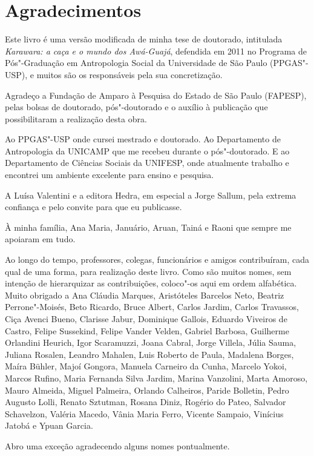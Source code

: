 \chapter*{Agradecimentos}


\noindent Este livro é uma versão modificada de minha tese de doutorado,
intitulada \emph{Karawara: a caça e o mundo dos Awá-Guajá}, defendida em
2011 no Programa de Pós"-Graduação em Antropologia Social da Universidade
de São Paulo (PPGAS"-USP), e muitos são os responsáveis pela sua
concretização.

Agradeço a Fundação de Amparo à Pesquisa do Estado de São Paulo
(FAPESP), pelas bolsas de doutorado, pós"-doutorado e o auxílio à
publicação que possibilitaram a realização desta obra.

Ao PPGAS"-USP onde cursei mestrado e doutorado. Ao Departamento de
Antropologia da UNICAMP que me recebeu durante o pós"-doutorado. E ao
Departamento de Ciências Sociais da UNIFESP, onde atualmente trabalho e
encontrei um ambiente excelente para ensino e pesquisa.

A Luísa Valentini e a editora Hedra, em especial a Jorge Sallum, pela
extrema confiança e pelo convite para que eu publicasse.

À minha família, Ana Maria, Januário, Aruan, Tainá e Raoni que sempre me
apoiaram em tudo.

Ao longo do tempo, professores, colegas, funcionários e amigos
contribuíram, cada qual de uma forma, para realização deste livro. Como
são muitos nomes, sem intenção de hierarquizar as contribuições,
coloco"-os aqui em ordem alfabética. Muito obrigado a Ana Cláudia
Marques, Aristóteles Barcelos Neto, Beatriz Perrone"-Moisés, Beto
Ricardo, Bruce Albert, Carlos Jardim, Carlos Travassos, Ciça Avenci
Bueno, Clarisse Jabur, Dominique Gallois, Eduardo Viveiros de Castro,
Felipe Sussekind, Felipe Vander Velden, Gabriel Barbosa, Guilherme
Orlandini Heurich, Igor Scaramuzzi, Joana Cabral, Jorge Villela, Júlia
Sauma, Juliana Rosalen, Leandro Mahalen, Luis Roberto de Paula, Madalena
Borges, Maíra Bühler, Majoí Gongora, Manuela Carneiro da Cunha, Marcelo
Yokoi, Marcos Rufino, Maria Fernanda Silva Jardim, Marina Vanzolini,
Marta Amoroso, Mauro Almeida, Miguel Palmeira, Orlando Calheiros, Paride
Bolletin, Pedro Augusto Lolli, Renato Sztutman, Rosana Diniz, Rogério do
Pateo, Salvador Schavelzon, Valéria Macedo, Vânia Maria Ferro, Vicente
Sampaio, Vinícius Jatobá e Ypuan Garcia.

Abro uma exceção agradecendo alguns nomes pontualmente.

